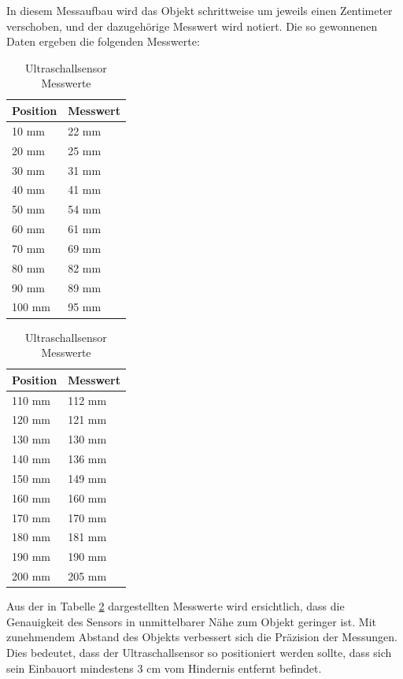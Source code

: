 \documentclass[../main.tex]{subfiles}
\begin{document}
In diesem Messaufbau wird das Objekt schrittweise um jeweils einen Zentimeter verschoben, und der dazugehörige Messwert wird notiert. Die so gewonnenen Daten ergeben die folgenden Messwerte:
\begin{table}[H]
\centering
\begin{minipage}{0.45\textwidth}
\centering
\begin{tabular}{@{}ll@{}}
\toprule
\textbf{Position} & \textbf{Messwert} \\
\midrule
10 mm  & 22 mm  \\
20 mm  & 25 mm  \\
30 mm  & 31 mm  \\
40 mm  & 41 mm  \\
50 mm  & 54 mm  \\
60 mm  & 61 mm  \\
70 mm  & 69 mm  \\
80 mm  & 82 mm  \\
90 mm  & 89 mm  \\
100 mm & 95 mm  \\
\bottomrule
\end{tabular}
\end{minipage}%
\hspace{0.05\textwidth} %
\begin{minipage}{0.45\textwidth}
\centering
\begin{tabular}{@{}ll@{}}
\toprule
\textbf{Position} & \textbf{Messwert} \\
\midrule
110 mm & 112 mm \\
120 mm & 121 mm \\
130 mm & 130 mm \\
140 mm & 136 mm \\
150 mm & 149 mm \\
160 mm & 160 mm \\
170 mm & 170 mm \\
180 mm & 181 mm \\
190 mm & 190 mm \\
200 mm & 205 mm \\
\bottomrule
\end{tabular}
\end{minipage}
\caption{Ultraschallsensor Messwerte}
\label{tab:UltraschallMD}
\end{table}

Aus der in Tabelle \ref{tab:UltraschallMD} dargestellten Messwerte wird ersichtlich, dass die Genauigkeit des Sensors in unmittelbarer Nähe zum Objekt geringer ist. Mit zunehmendem Abstand des Objekts verbessert sich die Präzision der Messungen. Dies bedeutet, dass der Ultraschallsensor so positioniert werden sollte, dass sich sein Einbauort mindestens 3 cm vom Hindernis entfernt befindet.
\end{document}
